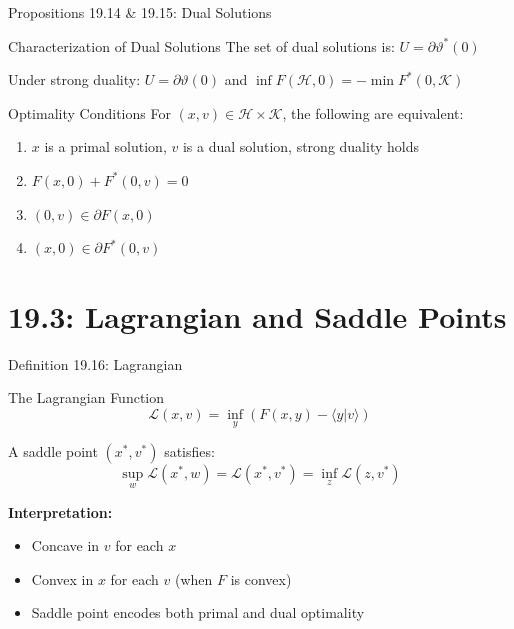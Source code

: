 \documentclass[aspectratio=169,10pt]{beamer}
\begin{document}
\begin{frame}{Propositions 19.14 \& 19.15: Dual Solutions}
    \begin{block}{Characterization of Dual Solutions}
        The set of dual solutions is: $U = \partial \vartheta^*(0)$

        Under strong duality: $U = \partial \vartheta(0)$ and $\inf F(\mathcal{H}, 0) = -\min F^*(0, \mathcal{K})$
    \end{block}

    \vspace{10pt}

    \begin{block}{Optimality Conditions}
        For $(x, v) \in \mathcal{H} \times \mathcal{K}$, the following are equivalent:
        \begin{enumerate}
            \item $x$ is a primal solution, $v$ is a dual solution, strong duality holds
            \item $F(x, 0) + F^*(0, v) = 0$
            \item $(0, v) \in \partial F(x, 0)$
            \item $(x, 0) \in \partial F^*(0, v)$
        \end{enumerate}
    \end{block}
\end{frame}

\section{19.3: Lagrangian and Saddle Points}

\begin{frame}{Definition 19.16: Lagrangian}
    \begin{block}{The Lagrangian Function}
        $$\mathcal{L}(x, v) = \inf_y (F(x, y) - \langle y | v \rangle)$$

        A saddle point $(x^*, v^*)$ satisfies:
        $$\sup_w \mathcal{L}(x^*, w) = \mathcal{L}(x^*, v^*) = \inf_z \mathcal{L}(z, v^*)$$
    \end{block}

    \vspace{10pt}

    \textbf{Interpretation:}
    \begin{itemize}
        \item Concave in $v$ for each $x$
        \item Convex in $x$ for each $v$ (when $F$ is convex)
        \item Saddle point encodes both primal and dual optimality
    \end{itemize}
\end{frame}
\end{document}
